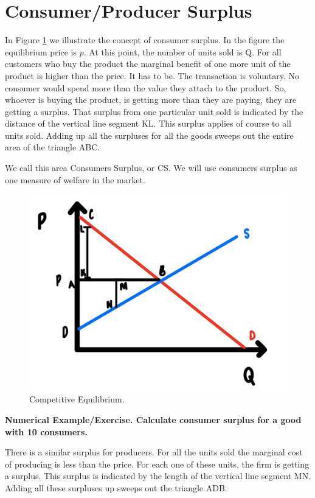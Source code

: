 \documentclass[
]{book}
\begin{document}
\hypertarget{consumerproducer-surplus}{%
\section{Consumer/Producer Surplus}\label{consumerproducer-surplus}}

In Figure \ref{fig:fig502} we illustrate the concept of consumer surplus. In the figure the equilibrium price is \(p\). At this point, the number of units sold is Q. For all customers who buy the product the marginal benefit of one more unit of the product is higher than the price. It has to be. The transaction is voluntary. No consumer would spend more than the value they attach to the product. So, whoever is buying the product, is getting more than they are paying, they are getting a surplus. That surplus from one particular unit sold is indicated by the distance of the vertical line segment KL. This surplus applies of course to all units sold. Adding up all the surpluses for all the goods sweeps out the entire area of the triangle ABC.

We call this area Consumers Surplus, or CS. We will use consumers surplus as one measure of welfare in the market.

\begin{figure}

{\centering \includegraphics[width=0.5\linewidth]{img/ch5/fig2} 

}

\caption{Competitive Equilibrium.}\label{fig:fig502}
\end{figure}

\begin{addition}
\textbf{Numerical Example/Exercise. Calculate consumer surplus for a good with 10 consumers.}

\end{addition}

There is a similar surplus for producers. For all the units sold the marginal cost of producing is less than the price. For each one of these units, the firm is getting a surplus. This surplus is indicated by the length of the vertical line segment MN. Adding all these surpluses up sweeps out the triangle ADB.
\end{document}
